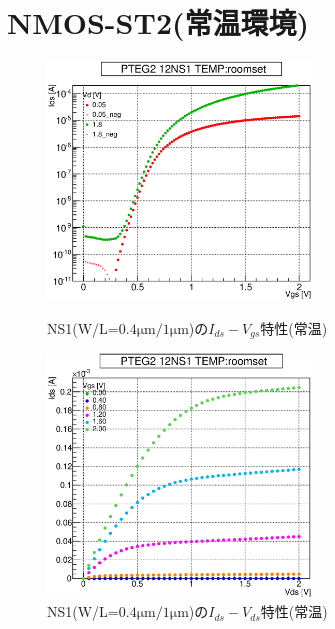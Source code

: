 		\section{NMOS-ST2(常温環境)}
				\begin{figure}[htbp]
					\begin{minipage}{0.5\hsize}
						\begin{center}
							\includegraphics[width=70mm]{./Chapter/Appendix/Picture/NST/NS1/PTEG2_12_NS1_IdVg_roomset.eps}
						\end{center}
						\caption{NS1(W/L=$0.4\mathrm{\mu m}/1\mathrm{\mu m}$)の$I_{ds}-V_{gs}$特性(常温)}
						\label{fig:NS1_IdVg_room}
					\end{minipage}
					\begin{minipage}{0.5\hsize}
						\begin{center}
							\includegraphics[width=70mm]{./Chapter/Appendix/Picture/NST/NS1/PTEG2_12_NS1_IdVd_roomset.eps}
						\end{center}
						\caption{NS1(W/L=$0.4\mathrm{\mu m}/1\mathrm{\mu m}$)の$I_{ds}-V_{ds}$特性(常温)}
						\label{fig:NS1_IdVd_room}
					\end{minipage}
				\end{figure}
